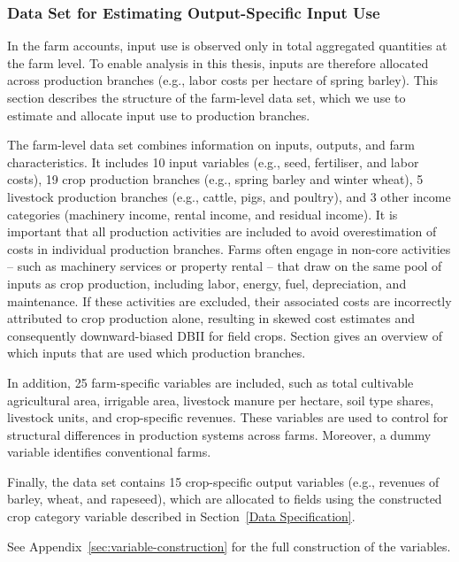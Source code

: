 \documentclass[12pt]{article}
\begin{document}
\subsubsection{Data Set for Estimating Output-Specific Input Use}
In the farm accounts, input use is observed only in total aggregated quantities at the farm level. 
To enable analysis in this thesis, inputs are therefore allocated across production branches (e.g., labor costs per hectare of spring barley).
This section describes the structure of the farm-level data set, which we use to estimate and allocate input use to production branches.

The farm-level data set combines information on inputs, outputs, and farm characteristics. 
It includes 10 input variables (e.g., seed, fertiliser, and labor costs), 19 crop production branches (e.g., spring barley and winter wheat), 5 livestock production branches (e.g., cattle, pigs, and poultry), and 3 other income categories (machinery income, rental income, and residual income). 
It is important that all production activities are included to avoid overestimation of costs in individual production branches. Farms often engage in non-core activities -- such as machinery services or property rental -- that draw on the same pool of inputs as crop production, including labor, energy, fuel, depreciation, and maintenance. 
If these activities are excluded, their associated costs are incorrectly attributed to crop production alone, resulting in skewed cost estimates and consequently downward-biased DBII for field crops.
Section gives an overview of which inputs that are used which production branches. 

In addition, 25 farm-specific variables are included, such as total cultivable agricultural area, irrigable area, livestock manure per hectare, soil type shares, livestock units, and crop-specific revenues. These variables are used to control for structural differences in production systems across farms.
Moreover, a dummy variable identifies conventional farms.

Finally, the data set contains 15 crop-specific output variables (e.g., revenues of barley, wheat, and rapeseed), which are allocated to fields using the constructed crop category variable described in Section~\ref{Data Specification}. 



See Appendix~\ref{sec:variable-construction} for the full construction of the variables. 
\end{document}
